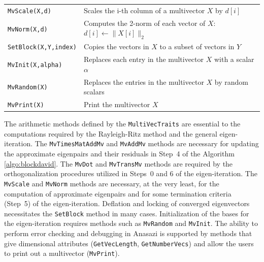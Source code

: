 \documentclass[acmtoms]{acmtrans2m}
\newcommand{\aspace}[1]{\texttt{#1}}
\begin{document}
\begin{table}
\begin{center}
\begin{tabular}{| p{4cm} | p{8cm} |}
{\tt MvScale(X,d)}    & Scales the i-th column of a multivector $X$ by $d[i]$ \\

{\tt MvNorm(X,d)}     & Computes the 2-norm of each vector of
$X$: $d[i] \leftarrow \|X[i]\|_2$  \\\hline

{\tt SetBlock(X,Y,index)} & Copies the vectors in $X$ to a subset of vectors in
$Y$ \\

{\tt MvInit(X,alpha)} & Replaces each entry in the multivector $X$ with a scalar $\alpha$  \\

{\tt MvRandom(X)} & Replaces the entries in the multivector $X$ by random
scalars \\\hline

{\tt MvPrint(X)} & Print the multivector $X$ \\

\hline
\end{tabular}
\end{center}
\end{table}


The arithmetic methods defined by the \aspace{MultiVecTraits} are essential to the
computations required by the Rayleigh-Ritz method and the general eigen-iteration.  The
\aspace{MvTimesMatAddMv} and \aspace{MvAddMv} methods are necessary for updating the
approximate eigenpairs and their residuals in Step~4 of the Algorithm
\ref{algo:blockdavid}.  The \aspace{MvDot} and \aspace{MvTransMv} methods are required by
the orthogonalization procedures utilized in Steps~0 and 6 of the eigen-iteration. The
\aspace{MvScale} and \aspace{MvNorm} methods are necessary, at the very least, for the
computation of approximate eigenpairs and for some termination criteria (Step~5) of the
eigen-iteration.  Deflation and locking of converged eigenvectors necessitates the
\aspace{SetBlock} method in many cases.  Initialization of the bases for the
eigen-iteration requires methods such as \aspace{MvRandom} and \aspace{MvInit}.  The
ability to perform error checking and debugging in Anasazi is supported by methods that
give dimensional attributes (\aspace{GetVecLength}, \aspace{GetNumberVecs}) and allow the
users to print out a multivector (\aspace{MvPrint}). 
\end{document}
